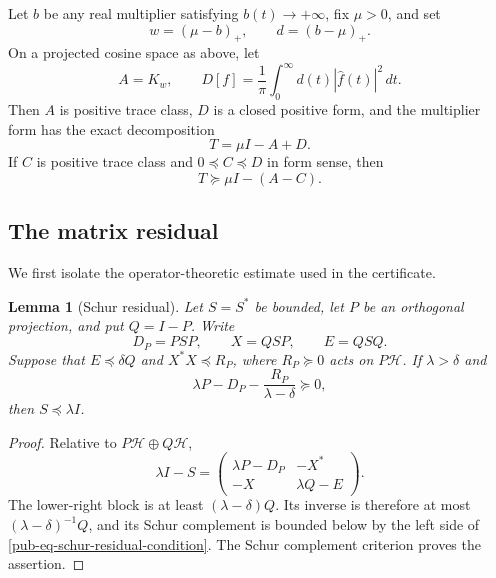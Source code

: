 \documentclass[11pt]{article}
\newtheorem{lemma}[theorem]{Lemma}
\theoremstyle{remark}
\begin{document}
Let \(b\) be any real multiplier satisfying \(b(t)\to+\infty\), fix \(\mu>0\), and set
\begin{equation}
 w=(\mu-b)_+,
 \qquad d=(b-\mu)_+.
\label{pub-eq-positive-negative-split}
\end{equation}
On a projected cosine space as above, let
\begin{equation}
 A=K_w,
 \qquad
 D[f]=\frac1\pi\int_0^\infty d(t)|\widehat f(t)|^2\,dt.
\label{pub-eq-adverse-favorable}
\end{equation}
Then \(A\) is positive trace class, \(D\) is a closed positive form,
and the multiplier form has the exact decomposition
\begin{equation}
             T=\mu I-A+D.
\label{pub-eq-canonical-rescue-split}
\end{equation}
If \(C\) is positive trace class and \(0\preceq C\preceq D\) in form sense, then
\begin{equation}
             T\succeq\mu I-(A-C).
\label{pub-eq-retained-rescue}
\end{equation}

\subsection{The matrix residual}

We first isolate the operator-theoretic estimate used in the certificate.

\begin{lemma}[Schur residual]
\label{pub-lem-schur-residual}
Let \(S=S^*\) be bounded, let \(P\) be an orthogonal projection, and put \(Q=I-P\).
Write
\[
 D_P=PSP,\qquad X=QSP,\qquad E=QSQ.
\]
Suppose that \(E\preceq\delta Q\) and \(X^*X\preceq R_P\),
where \(R_P\succeq0\) acts on \(P\mathcal H\).
If \(\lambda>\delta\) and
\begin{equation}
 \lambda P-D_P-\frac{R_P}{\lambda-\delta}\succeq0,
\label{pub-eq-schur-residual-condition}
\end{equation}
then \(S\preceq\lambda I\).
\end{lemma}

\begin{proof}
Relative to \(P\mathcal H\oplus Q\mathcal H\),
\[
 \lambda I-S=
 \begin{pmatrix}
   \lambda P-D_P&-X^*\\
   -X&\lambda Q-E
 \end{pmatrix}.
\]
The lower-right block is at least \((\lambda-\delta)Q\).
Its inverse is therefore at most \((\lambda-\delta)^{-1}Q\),
and its Schur complement is bounded below by the left side of \eqref{pub-eq-schur-residual-condition}.
The Schur complement criterion proves the assertion.
\end{proof}
\end{document}
